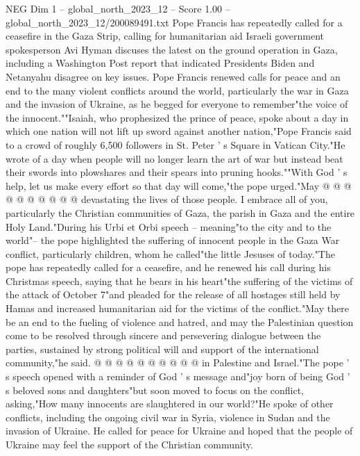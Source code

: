 \begin{textsample}{NEG Dim 1 – global\_north\_2023\_12 – Score 1.00 – global\_north\_2023\_12/200089491.txt}  \label{ex:f1_neg_200}
Pope Francis has repeatedly called for a ceasefire in the Gaza Strip, calling for humanitarian aid Israeli government spokesperson Avi Hyman discuses the latest on the ground operation in Gaza, including a Washington Post report that indicated Presidents Biden and Netanyahu disagree on key issues.
Pope Francis renewed calls for peace and an end to the many violent conflicts around the world, particularly the war in Gaza and the invasion of Ukraine, as he begged for everyone to remember"the voice of the innocent.""Isaiah, who prophesized the prince of peace, spoke about a day in which one nation will not lift up sword against another nation,"Pope Francis said to a crowd of roughly 6,500 followers in St.
Peter ' s Square in Vatican City."He wrote of a day when people will no longer learn the art of war but instead beat their swords into plowshares and their spears into pruning hooks.""With God ' s help, let us make every effort so that day will come,"the pope urged."May @ @ @ @ @ @ @ @ @ @ devastating the lives of those people.
I embrace all of you, particularly the Christian communities of Gaza, the parish in Gaza and the entire Holy Land."During his Urbi et Orbi speech -- meaning"to the city and to the world"-- the pope highlighted the suffering of innocent people in the Gaza War conflict, particularly children, whom he called"the little Jesuses of today."The pope has repeatedly called for a ceasefire, and he renewed his call during his Christmas speech, saying that he bears in his heart"the suffering of the victims of the attack of October 7"and pleaded for the release of all hostages still held by Hamas and increased humanitarian aid for the victims of the conflict."May there be an end to the fueling of violence and hatred, and may the Palestinian question come to be resolved through sincere and persevering dialogue between the parties, sustained by strong political will and support of the international community,"he said. @ @ @ @ @ @ @ @ @ @ in Palestine and Israel."The pope ' s speech opened with a reminder of God ' s message and"joy born of being God ' s beloved sons and daughters"but soon moved to focus on the conflict, asking,"How many innocents are slaughtered in our world?"He spoke of other conflicts, including the ongoing civil war in Syria, violence in Sudan and the invasion of Ukraine.
He called for peace for Ukraine and hoped that the people of Ukraine may feel the support of the Christian community.

\end{textsample}
